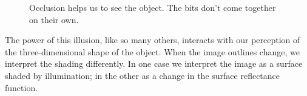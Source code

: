 \begin{figure}
\centerline{
}
\caption[Kersten Cylinder]{}
\label{f10:kerstenCylinder}
\end{figure}

\begin{figure}
\centerline{
}
\caption[Occluded Necker]{
Occlusion helps us to see the object.
The bits don't come together on their own.
}
\label{f10:occludedNecker}
\end{figure}

\begin{figure}
\centerline{
}
\caption[Rama Shading]{}
\label{f10:ramaShading}
\end{figure}
The power of this illusion, like so many others, interacts with our
perception of the three-dimensional shape of the object.  When the
image outlines change, we interpret the shading differently.  In one
case we interpret the image as a surface shaded by illumination; in
the other as a change in the surface reflectance function.


\begin{figure}
\centerline{
}
\caption[Geometrical Illusions]{}
\label{f10:length}
\end{figure}

